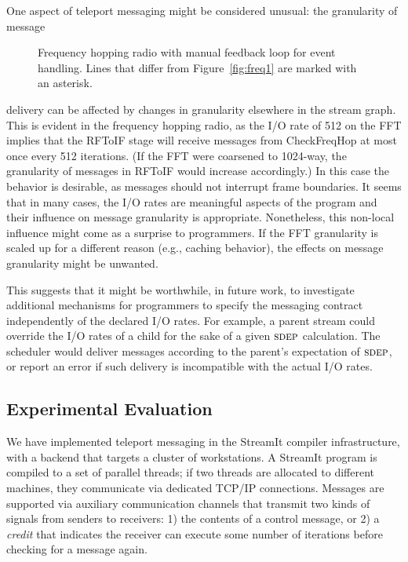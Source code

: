 One aspect of teleport messaging might be considered unusual: the
granularity of message
%
\begin{figure}[t]
\centering
\vspace{-26pt}
\hspace{-0.2in}
\vspace{-10pt}
\caption[Code for frequency hopping radio with manual control
  messages]{Frequency hopping radio with manual feedback loop
  for event handling.  Lines that differ from Figure~\ref{fig:freq1}
  are marked with an asterisk. \protect\label{fig:freq2}}
\vspace{-12pt}
\end{figure}
\clearpage
%
\noindent delivery can be affected by changes in
granularity elsewhere in the stream graph.  This is evident in the
frequency hopping radio, as the I/O rate of 512 on the FFT implies
that the RFToIF stage will receive messages from CheckFreqHop at most
once every 512 iterations.  (If the FFT were coarsened to 1024-way,
the granularity of messages in RFToIF would increase accordingly.)  In
this case the behavior is desirable, as messages should not interrupt
frame boundaries.  It seems that in many cases, the I/O rates are
meaningful aspects of the program and their influence on message
granularity is appropriate.  Nonetheless, this non-local influence
might come as a surprise to programmers.  If the FFT granularity is
scaled up for a different reason (e.g., caching behavior), the effects
on message granularity might be unwanted.

This suggests that it might be worthwhile, in future work, to
investigate additional mechanisms for programmers to specify the
messaging contract independently of the declared I/O rates.  For
example, a parent stream could override the I/O rates of a child for
the sake of a given $\textsc{sdep}$ calculation.  The scheduler would deliver
messages according to the parent's expectation of $\textsc{sdep}$, or report
an error if such delivery is incompatible with the actual I/O rates.

\subsection*{Experimental Evaluation}
\label{sec:evaluation}

We have implemented teleport messaging in the StreamIt compiler
infrastructure, with a backend that targets a cluster of workstations.
A StreamIt program is compiled to a set of parallel threads; if two
threads are allocated to different machines, they communicate via
dedicated TCP/IP connections.  Messages are supported via auxiliary
communication channels that transmit two kinds of signals from senders
to receivers: 1) the contents of a control message, or 2) a {\it
credit} that indicates the receiver can execute some number of
iterations before checking for a message again.


